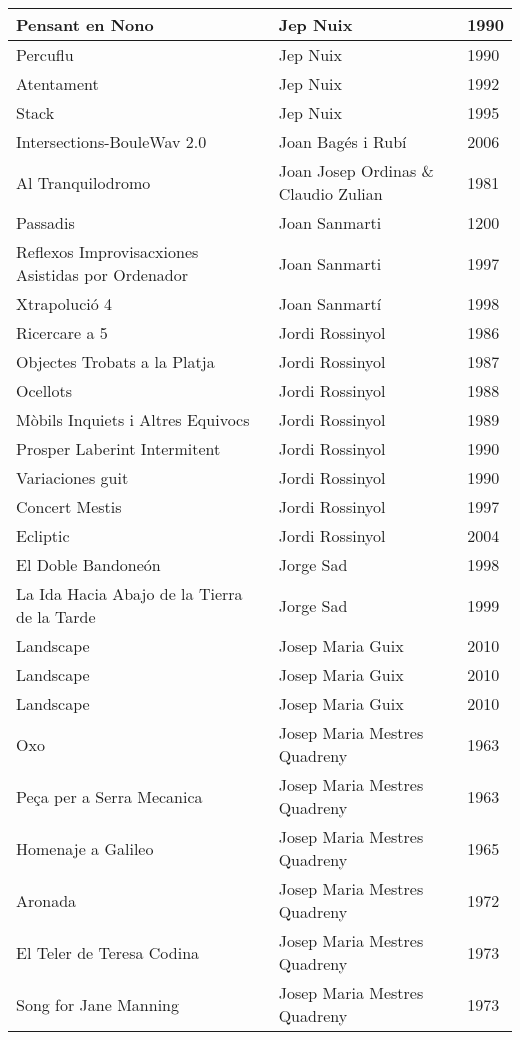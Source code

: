 \begin{center}
\begin{longtable}{| p{} | p{} | p{} |}
Pensant en Nono & Jep Nuix & 1990 \\ \hline 
Percuflu & Jep Nuix & 1990 \\ \hline 
Atentament & Jep Nuix & 1992 \\ \hline 
Stack & Jep Nuix & 1995 \\ \hline 
Intersections-BouleWav 2.0 & Joan Bagés i Rubí & 2006 \\ \hline 
Al Tranquilodromo & Joan Josep Ordinas \& Claudio Zulian & 1981 \\ \hline 
Passadis & Joan Sanmarti & 1200 \\ \hline 
Reflexos Improvisacxiones Asistidas por Ordenador & Joan Sanmarti & 1997 \\ \hline 
Xtrapolució 4 & Joan Sanmartí & 1998 \\ \hline 
Ricercare a 5 & Jordi Rossinyol & 1986 \\ \hline 
Objectes Trobats a la Platja & Jordi Rossinyol & 1987 \\ \hline 
Ocellots & Jordi Rossinyol & 1988 \\ \hline 
Mòbils Inquiets i Altres Equivocs & Jordi Rossinyol & 1989 \\ \hline 
Prosper Laberint Intermitent & Jordi Rossinyol & 1990 \\ \hline 
Variaciones guit & Jordi Rossinyol & 1990 \\ \hline 
Concert Mestis & Jordi Rossinyol & 1997 \\ \hline 
Ecliptic & Jordi Rossinyol & 2004 \\ \hline 
El Doble Bandoneón & Jorge Sad & 1998 \\ \hline 
La Ida Hacia Abajo de la Tierra de la Tarde & Jorge Sad & 1999 \\ \hline 
Landscape & Josep Maria Guix & 2010 \\ \hline 
Landscape & Josep Maria Guix & 2010 \\ \hline 
Landscape & Josep Maria Guix & 2010 \\ \hline 
Oxo & Josep Maria Mestres Quadreny & 1963 \\ \hline 
Peça per a Serra Mecanica & Josep Maria Mestres Quadreny & 1963 \\ \hline 
Homenaje a Galileo & Josep Maria Mestres Quadreny & 1965 \\ \hline 
Aronada & Josep Maria Mestres Quadreny & 1972 \\ \hline 
El Teler de Teresa Codina & Josep Maria Mestres Quadreny & 1973 \\ \hline 
Song for Jane Manning & Josep Maria Mestres Quadreny & 1973 \\ \hline 

\end{longtable}
\end{center}
